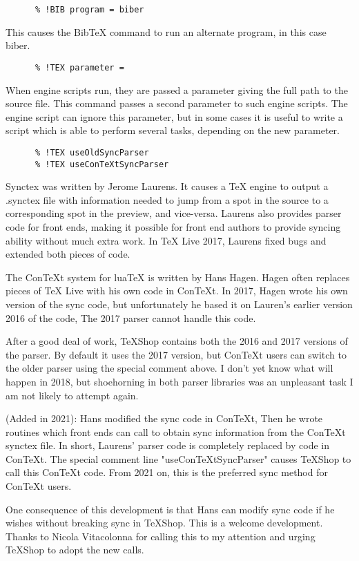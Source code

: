 \documentclass[11pt, oneside]{article}   	%
\begin{document}
  \begin{verbatim}
      % !BIB program = biber
 \end{verbatim}
 This causes the BibTeX command to run an alternate program, in this case biber.    
  
  \begin{verbatim}
      % !TEX parameter = 
 \end{verbatim}
When engine scripts run, they are passed a parameter giving the full path to the source file. This command passes a second parameter to such engine scripts. The engine script can ignore this parameter, but in some cases it is useful to write a script which is able to perform several tasks, depending on the new parameter.  
     
  \begin{verbatim}
      % !TEX useOldSyncParser
      % !TEX useConTeXtSyncParser
 \end{verbatim}
Synctex was written by Jerome Laurens. It causes a TeX engine to output a .synctex file with information needed to jump from a spot in the source to a corresponding spot in the preview, and vice-versa. Laurens also provides parser code for front ends, making it possible for front end authors to provide syncing ability without much extra work. In TeX Live 2017, Laurens fixed bugs and extended both pieces of code.

The ConTeXt system for luaTeX is written by Hans Hagen. Hagen often replaces pieces of TeX Live with his own code in ConTeXt. In 2017, Hagen wrote his own version of the sync code, but unfortunately he based it on Lauren's earlier version 2016 of the code, The 2017 parser cannot handle this code.

After a good deal of work, TeXShop contains both the 2016 and 2017 versions of the parser. By default it uses the 2017 version, but ConTeXt users can switch to the older parser using the special comment above. I don't yet know what will happen in 2018, but shoehorning in both parser libraries was an unpleasant task I am not likely to attempt again.

(Added in 2021): Hans modified the sync code in ConTeXt, Then he wrote routines which front ends can call to obtain  sync information from the ConTeXt synctex file. In short, Laurens' parser code is completely replaced by code in ConTeXt. The special comment line "useConTeXtSyncParser" causes TeXShop to call this ConTeXt code. From 2021 on, this is the preferred sync method for ConTeXt users. 

One consequence of this development is that Hans can  modify sync code if he wishes without breaking sync in TeXShop. This is a welcome development. Thanks to Nicola Vitacolonna for calling this to my attention and urging TeXShop to adopt the new calls.
\end{document}
